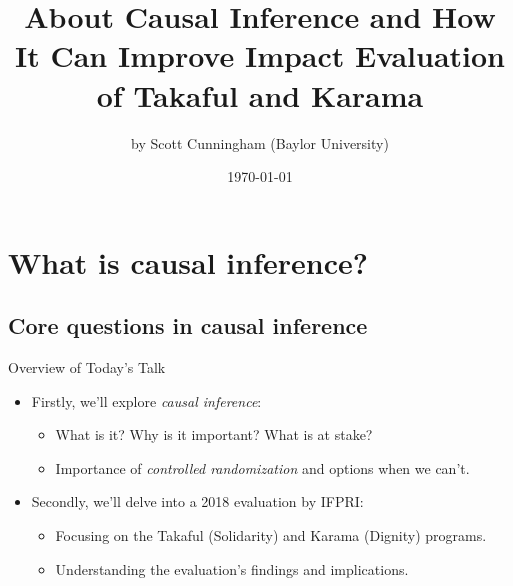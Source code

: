 \documentclass{beamer}
\begin{document}
\title{About Causal Inference and How It Can Improve Impact Evaluation of Takaful and Karama}
\author{by Scott Cunningham (Baylor University)}
\date{\today}

\begin{frame}
\titlepage
\end{frame}


\section{What is causal inference?}



\subsection{Core questions in causal inference}



\begin{frame}{Overview of Today's Talk}
\begin{itemize}
\item Firstly, we'll explore \emph{causal inference}: 
    \begin{itemize}
    \item What is it?  Why is it important?  What is at stake? %
    \item Importance of \emph{controlled randomization} and options when we can't.
    \end{itemize}
\item Secondly, we'll delve into a 2018 evaluation by IFPRI:
    \begin{itemize}
    \item Focusing on the Takaful (Solidarity) and Karama (Dignity) programs.
    \item Understanding the evaluation's findings and implications.
    \end{itemize}
\end{itemize}
\end{frame}
\end{document}
